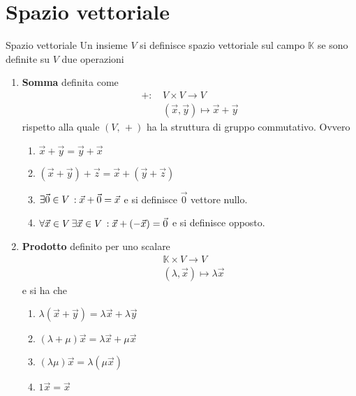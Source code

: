 
\section{Spazio vettoriale}%
\label{sec:spazio_vettoriale}

\begin{Def}{Spazio vettoriale}
  Un insieme $V$ si definisce spazio vettoriale sul campo $\mathbb{K}$ se sono definite
  su $V$ due operazioni
  \begin{enumerate}
    \item \textbf{Somma} definita come
      \begin{align*}
        +:\,&V\times V\to V\\
            &(\vec{x},\vec{y})\mapsto\vec{x}+\vec{y}
      \end{align*}
      rispetto alla quale $(V,\,+)$ ha la struttura di gruppo commutativo. Ovvero
      \begin{enumerate}
        \item $\vec{x}+\vec{y} = \vec{y}+\vec{x}$
        \item $(\vec{x}+\vec{y})+\vec{z} = \vec{x} + (\vec{y}+\vec{z})$
        \item $\exists\vec{0}\in V\,: \vec{x}+\vec{0}=\vec{x}$ e si definisce
          $\vec{0}$ vettore nullo.
        \item $\forall\vec{x}\in V\,\exists\vec{x}\in
          V\,:\vec{x}+(-\vec{x})=\vec{0}$ e si definisce opposto.
      \end{enumerate}
    \item \textbf{Prodotto} definito per uno scalare
      \begin{align*}
        &\mathbb{K}\times V\to V\\
        &(\lambda,\vec{x})\mapsto \lambda\vec{x}
      \end{align*}
      e si ha che
      \begin{enumerate}
        \item $\lambda(\vec{x}+\vec{y}) = \lambda\vec{x}+\lambda\vec{y}$
        \item $(\lambda+\mu)\vec{x} = \lambda\vec{x}+\mu\vec{x}$
        \item $(\lambda\mu)\vec{x} = \lambda(\mu\vec{x})$
        \item $1\vec{x} = \vec{x}$
      \end{enumerate}
  \end{enumerate}
\end{Def}

